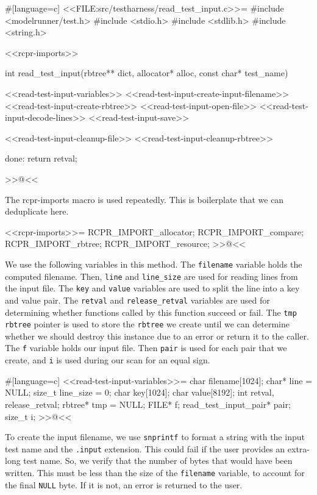 {#[language=c]
<<FILE:src/testharness/read_test_input.c>>=
#include <modelrunner/test.h>
#include <stdio.h>
#include <stdlib.h>
#include <string.h>

<<rcpr-imports>>

int read_test_input(rbtree** dict, allocator* alloc, const char* test_name)
{
    <<read-test-input-variables>>
    <<read-test-input-create-input-filename>>
    <<read-test-input-create-rbtree>>
    <<read-test-input-open-file>>
    <<read-test-input-decode-lines>>
    <<read-test-input-save>>

    <<read-test-input-cleanup-file>>
    <<read-test-input-cleanup-rbtree>>

done:
    return retval;
}
>>@<<

The rcpr-imports macro is used repeatedly. This is boilerplate that we can
deduplicate here.

<<rcpr-imports>>=
RCPR_IMPORT_allocator;
RCPR_IMPORT_compare;
RCPR_IMPORT_rbtree;
RCPR_IMPORT_resource;
>>@<<

We use the following variables in this method. The \verb/filename/ variable
holds the computed filename.  Then, \verb/line/ and \verb/line_size/ are used
for reading lines from the input file. The \verb/key/ and \verb/value/ variables
are used to split the line into a key and value pair.  The \verb/retval/ and
\verb/release_retval/ variables are used for determining whether functions
called by this function succeed or fail. The \verb/tmp/ \verb/rbtree/ pointer is
used to store the \verb/rbtree/ we create until we can determine whether we
should destroy this instance due to an error or return it to the caller. The
\verb/f/ variable holds our input file. Then \verb/pair/ is used for each pair
that we create, and \verb/i/ is used during our scan for an equal sign.

#[language=c]
<<read-test-input-variables>>=
    char filename[1024];
    char* line = NULL;
    size_t line_size = 0;
    char key[1024];
    char value[8192];
    int retval, release_retval;
    rbtree* tmp = NULL;
    FILE* f;
    read_test_input_pair* pair;
    size_t i;
>>@<<

To create the input filename, we use \verb/snprintf/ to format a string with
the input test name and the \verb/.input/ extension.  This could fail if the
user provides an extra-long test name. So, we verify that the number of bytes
that would have been written. This must be less than the size of the
\verb/filename/ variable, to account for the final \verb/NULL/ byte. If it is
not, an error is returned to the user.

}
